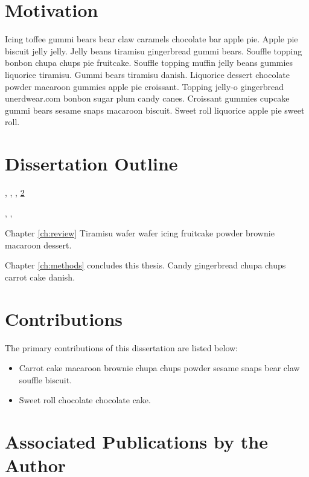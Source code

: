 \section{Motivation}

Icing toffee gummi bears bear claw caramels chocolate bar apple pie. Apple pie biscuit jelly jelly. Jelly beans tiramisu gingerbread gummi bears. Souffle topping bonbon chupa chups pie fruitcake. Souffle topping muffin jelly beans gummies liquorice tiramisu. Gummi bears tiramisu danish. Liquorice dessert chocolate powder macaroon gummies apple pie croissant. Topping jelly-o gingerbread unerdwear.com bonbon sugar plum candy canes. Croissant gummies cupcake gummi bears sesame snaps macaroon biscuit. Sweet roll liquorice apple pie sweet roll.

\section{Dissertation Outline}\label{sec:do}
\label{sec:outline}

\thesection, \thesubsection, \thechapter, \ref{sec:do}

, , 

\begin{description}
	
\item Chapter \ref{ch:review} Tiramisu wafer wafer icing fruitcake powder brownie macaroon dessert. 

\item Chapter \ref{ch:methods} concludes this thesis. Candy gingerbread chupa chups carrot cake danish. 
\end{description}

\section{Contributions}
The primary contributions of this dissertation are listed below:

\begin{itemize}
  \onehalfspacing
\item Carrot cake macaroon brownie chupa chups powder sesame snaps bear claw souffle biscuit. 
\item Sweet roll chocolate chocolate cake. 
\end{itemize}

\section{Associated Publications by the Author}

